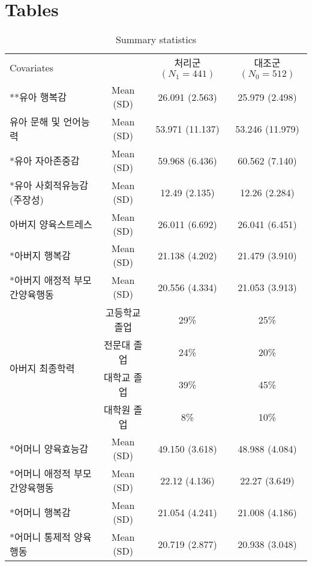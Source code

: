\documentclass{article}
\begin{document}
\section*{Tables}

\begin{table}[t]
\caption{Summary statistics} \label{tb2}
\footnotesize
\centering
{\tabcolsep=13pt
\begin{tabular}{l||c|c|c}
\hline
Covariates                &           & 처리군 $(N_1=441)$                & 대조군 $(N_0=512)$                  \\ \hhline{=#=|=|=} 
**유아 행복감                  & Mean (SD) & 26.091 (2.563)      & 25.979 (2.498)       \\ \hline
유아 문해 및 언어능력              & Mean (SD) & 53.971 (11.137)     & 53.246 (11.979)      \\ \hline
*유아 자아존중감                 & Mean (SD) & 59.968 (6.436)      & 60.562 (7.140)       \\ \hline
*유아 사회적유능감 (주장성)          & Mean (SD) & 12.49 (2.135)       & 12.26 (2.284)        \\ \hline
아버지 양육스트레스                & Mean (SD) & 26.011 (6.692)      & 26.041 (6.451)       \\ \hline
*아버지 행복감                  & Mean (SD) & 21.138 (4.202)      & 21.479 (3.910)       \\ \hline
*아버지 애정적 부모간양육행동          & Mean (SD) & 20.556 (4.334)      & 21.053 (3.913)       \\ \hline
\multirow{4}{*}{아버지 최종학력} & 고등학교 졸업   & 29\%                & 25\%                 \\ \cline{2-4} 
                          & 전문대 졸업    & 24\%                & 20\%                 \\ \cline{2-4} 
                          & 대학교 졸업    & 39\%                & 45\%                 \\ \cline{2-4} 
                          & 대학원 졸업    & 8\%                 & 10\%                 \\ \hline
*어머니 양육효능감                & Mean (SD) & 49.150 (3.618)      & 48.988 (4.084)       \\ \hline
*어머니 애정적 부모간양육행동          & Mean (SD) & 22.12 (4.136)       & 22.27 (3.649)        \\ \hline
*어머니 행복감          & Mean (SD) & 21.054 (4.241)       & 21.008 (4.186)        \\ \hline
*어머니 통제적 양육행동             & Mean (SD) & 20.719 (2.877)      & 20.938 (3.048)       \\ \hline

\end{tabular}}
\end{table}
\end{document}
